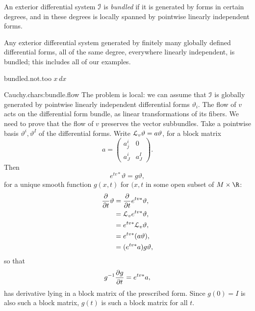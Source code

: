 

%
An exterior differential system \(\mathcal{I}\) is \emph{bundled} if it is generated by forms in certain degrees, and in these degrees is locally spanned by pointwise linearly independent forms.
\begin{example}
Any exterior differential system generated by finitely many globally defined differential forms, all of the same degree, everywhere linearly independent, is bundled; this includes all of our examples. 
\end{example}
%
\begin{answer}{bundled.not.too}%
\(x \, dx\)
\end{answer}
\begin{answer}{Cauchy.chars:bundle.flow}
The problem is local: we can assume that \(\mathcal{I}\) is globally generated by pointwise linearly independent differential forms \(\vartheta_i\).
The flow of \(v\) acts on the differential form bundle, as linear transformations of its fibers.
We need to prove that the flow of \(v\) preserves the vector subbundles.
Take a pointwise basis \(\vartheta^i,\vartheta^I\) of the differential forms. Write \(\EuScript L_v \vartheta=a\vartheta\), for a block matrix
\[
a=
\begin{pmatrix}
a^i_j & 0 \\
a^i_J & a^I_J
\end{pmatrix}.
\]
Then
\[
e^{tv*}\vartheta=g\vartheta,
\]
for a unique smooth function \(g(x,t)\) for \((x,t\) in some open subset of \(M\times\R\):
\begin{align*}
\pderiv{}{t}\vartheta
&=
\pderiv{}{t}e^{tv*}\vartheta,
\\
&=
\LieDer_v e^{tv*}\vartheta,
\\
&=
e^{tv*}\LieDer_v\vartheta,
\\
&=
e^{tv*}(a\vartheta),
\\
&=
(e^{tv*}a)g\vartheta,
\end{align*}
so that
\[
g^{-1}\pderiv{g}{t}=e^{tv*}a,
\]
has derivative lying in a block matrix of the prescribed form.
Since \(g(0)=I\) is also such a block matrix, \(g(t)\) is such a block matrix for all \(t\).
\end{answer}
